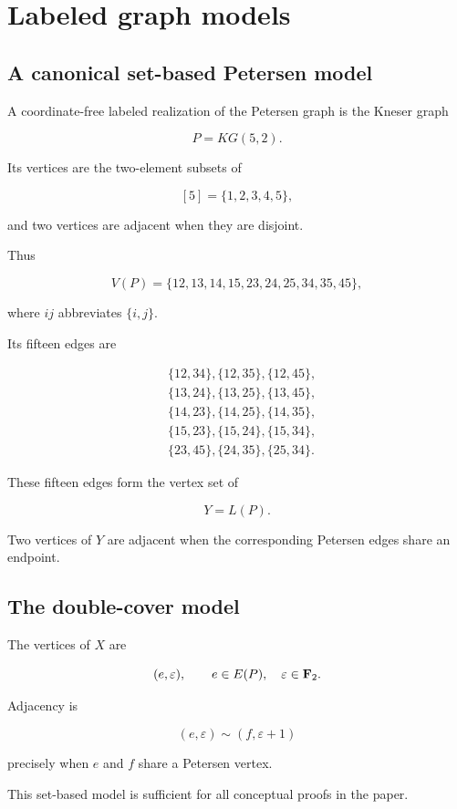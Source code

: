 \section{Labeled graph models}

\subsection{A canonical set-based Petersen model}

A coordinate-free labeled realization of the Petersen graph is the Kneser
graph

\[
P=KG(5,2).
\]

Its vertices are the two-element subsets of

\[
[5]=\{1,2,3,4,5\},
\]

and two vertices are adjacent when they are disjoint.

Thus

\[
V(P)
=
\{
12,13,14,15,23,24,25,34,35,45
\},
\]

where \(ij\) abbreviates \(\{i,j\}\).

Its fifteen edges are

\[
\begin{aligned}
&
\{12,34\},\{12,35\},\{12,45\},\\
&
\{13,24\},\{13,25\},\{13,45\},\\
&
\{14,23\},\{14,25\},\{14,35\},\\
&
\{15,23\},\{15,24\},\{15,34\},\\
&
\{23,45\},\{24,35\},\{25,34\}.
\end{aligned}
\]

These fifteen edges form the vertex set of

\[
Y=L(P).
\]

Two vertices of \(Y\) are adjacent when the corresponding Petersen edges
share an endpoint.

\subsection{The double-cover model}

The vertices of \(X\) are

\[
(e,\varepsilon),
\qquad
e\in E(P),
\quad
\varepsilon\in\mathbf F_2.
\]

Adjacency is

\[
(e,\varepsilon)
\sim
(f,\varepsilon+1)
\]

precisely when \(e\) and \(f\) share a Petersen vertex.

This set-based model is sufficient for all conceptual proofs in the paper.

